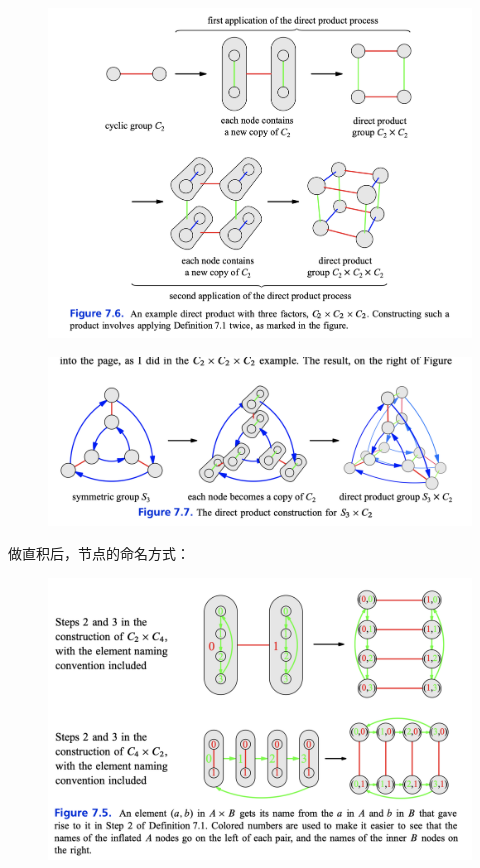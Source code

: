 \documentclass[12pt]{article}
\begin{document}
\begin{figure}[H]
    \centering
    \includegraphics[width=1\textwidth]{fig/Group/Cayley-C2-times-C2-times-C2.png}
\end{figure}
\begin{figure}[H]
    \centering
    \includegraphics[width=1\textwidth]{fig/Group/Cayley-S3-times-C2.png}
\end{figure}

做直积后，节点的命名方式：
\begin{figure}[H]
    \centering
    \includegraphics[width=1\textwidth]{fig/Group/Cayley-Direct-Product-Naming.png}
\end{figure}
\end{document}
